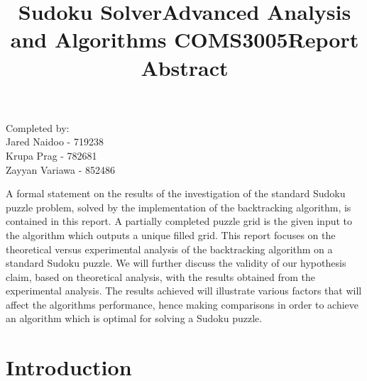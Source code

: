 \documentclass[12pt]{article}
\begin{document}
\title{\textbf{Sudoku Solver}}
\maketitle

\begin{center}
\title{\textbf{Advanced Analysis and Algorithms COMS3005}}
\maketitle 
\end{center}
\begin{center}
\title{\textbf{Report}}
\maketitle 
\end{center}

\begin{center}
Completed by:\\
Jared Naidoo - 719238
\\Krupa Prag - 782681
\\Zayyan Variawa - 852486
\end{center}

\newpage
\begin{center}
\title{\textbf{ Abstract}}
\end{center}
A formal statement on the results of the investigation of the standard Sudoku puzzle problem, solved by the implementation of the backtracking algorithm, is contained in this report. A partially completed puzzle grid is the given input to the algorithm which outputs a unique filled grid. This report focuses on the theoretical versus experimental analysis of the backtracking algorithm on a standard Sudoku puzzle.  We will further discuss the validity of our hypothesis claim, based on theoretical analysis, with the results obtained from the experimental analysis. The results achieved will illustrate various factors that will affect the algorithms performance, hence making comparisons in order to achieve an algorithm which is optimal for solving a Sudoku puzzle. 
\newpage
\tableofcontents

\newpage

\section{Introduction}
\end{document}
